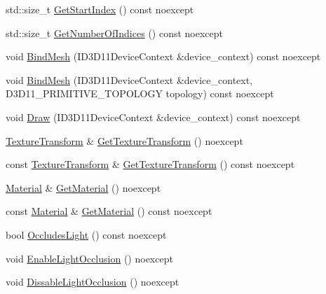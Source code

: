 \begin{DoxyCompactItemize}
std\+::size\+\_\+t \mbox{\hyperlink{classmage_1_1rendering_1_1_model_a419dd6f4ea7f32ac3d165ce87d54fb47}{Get\+Start\+Index}} () const noexcept
\item 
std\+::size\+\_\+t \mbox{\hyperlink{classmage_1_1rendering_1_1_model_a4e8445480b07026d2f758d879c8c9d56}{Get\+Number\+Of\+Indices}} () const noexcept
\item 
void \mbox{\hyperlink{classmage_1_1rendering_1_1_model_a78defd61277c92a529c4811f1c7c391b}{Bind\+Mesh}} (I\+D3\+D11\+Device\+Context \&device\+\_\+context) const noexcept
\item 
void \mbox{\hyperlink{classmage_1_1rendering_1_1_model_a7793e3f1fa480cb4dc423845fc4de45f}{Bind\+Mesh}} (I\+D3\+D11\+Device\+Context \&device\+\_\+context, D3\+D11\+\_\+\+P\+R\+I\+M\+I\+T\+I\+V\+E\+\_\+\+T\+O\+P\+O\+L\+O\+GY topology) const noexcept
\item 
void \mbox{\hyperlink{classmage_1_1rendering_1_1_model_aaa10d71022d4f6ac8e51ec95861f3317}{Draw}} (I\+D3\+D11\+Device\+Context \&device\+\_\+context) const noexcept
\item 
\mbox{\hyperlink{classmage_1_1_texture_transform}{Texture\+Transform}} \& \mbox{\hyperlink{classmage_1_1rendering_1_1_model_a57e4069226ce9bade50bc17503378f08}{Get\+Texture\+Transform}} () noexcept
\item 
const \mbox{\hyperlink{classmage_1_1_texture_transform}{Texture\+Transform}} \& \mbox{\hyperlink{classmage_1_1rendering_1_1_model_adc18923fdb300d1eb753c9dcb9d30677}{Get\+Texture\+Transform}} () const noexcept
\item 
\mbox{\hyperlink{classmage_1_1rendering_1_1_material}{Material}} \& \mbox{\hyperlink{classmage_1_1rendering_1_1_model_af6e23f8327e82af4d6c2aa854329608c}{Get\+Material}} () noexcept
\item 
const \mbox{\hyperlink{classmage_1_1rendering_1_1_material}{Material}} \& \mbox{\hyperlink{classmage_1_1rendering_1_1_model_afcdf381e409cc7c7be878a60c1799c1b}{Get\+Material}} () const noexcept
\item 
bool \mbox{\hyperlink{classmage_1_1rendering_1_1_model_ac6238580ce9572b9274bf21852f73455}{Occludes\+Light}} () const noexcept
\item 
void \mbox{\hyperlink{classmage_1_1rendering_1_1_model_a6fc53c4d0d5983ecd2f1910002b4dcfc}{Enable\+Light\+Occlusion}} () noexcept
\item 
void \mbox{\hyperlink{classmage_1_1rendering_1_1_model_a4dc86a18b06ee751f2e208acc21f709e}{Dissable\+Light\+Occlusion}} () noexcept
\item 

\end{DoxyCompactItemize}
